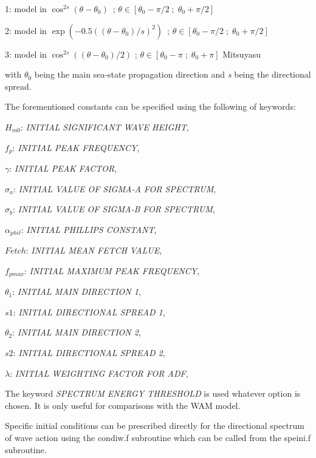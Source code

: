  1:  model in $\cos ^{2s} (\theta -\theta _{0} )$~; $\theta \in \left[\theta _{0} -\pi /2\; ;\; \theta _{0} +\pi /2\right]$

 2:  model in $\exp \left(-0.5\left(\left(\theta -\theta _{0} \right)/s\right)^{2} \right)$~; $\theta \in \left[\theta _{0} -\pi /2\; ;\; \theta _{0} +\pi /2\right]$

 3:  model in $\cos ^{2s} \left(\left(\theta -\theta _{0} \right)/2\right)$ ; $\theta \in \left[\theta _{0} -\pi \; ;\; \theta _{0} +\pi \right]$ Mitsuyasu \cite{Mitsuyasu1975}

 with $\theta_{0}$ being the main sea-state propagation direction and \textit{s} being the directional spread.

 The forementioned constants can be specified using the following of keywords:

 $H_{m0}$: \textit{INITIAL SIGNIFICANT WAVE HEIGHT},

 $f_p$:  \textit{INITIAL PEAK FREQUENCY},

 $\gamma$:  \textit{INITIAL PEAK FACTOR},

 $\sigma_a$:  \textit{INITIAL VALUE OF SIGMA-A FOR SPECTRUM},

 $\sigma_b$:  \textit{INITIAL VALUE OF SIGMA-B FOR SPECTRUM},

 $\alpha_{phil}$:  \textit{INITIAL PHILLIPS CONSTANT},

 $Fetch$:  \textit{INITIAL MEAN FETCH VALUE},

 $f_{pmax}$:  \textit{INITIAL MAXIMUM PEAK FREQUENCY},

 $\theta_1$:  \textit{INITIAL MAIN DIRECTION 1},

 $s1$:  \textit{INITIAL DIRECTIONAL SPREAD 1},

 $\theta_2$:  \textit{INITIAL MAIN DIRECTION 2},

 $s2$:  \textit{INITIAL DIRECTIONAL SPREAD 2},

 $\lambda$:  \textit{INITIAL WEIGHTING FACTOR FOR ADF},


 The keyword \textit{SPECTRUM ENERGY THRESHOLD} is used whatever option is chosen. It is only useful for comparisons with the WAM model.

 Specific initial conditions can be prescribed directly for the directional spectrum of wave action using the condiw.f subroutine which can be called from the speini.f subroutine.

